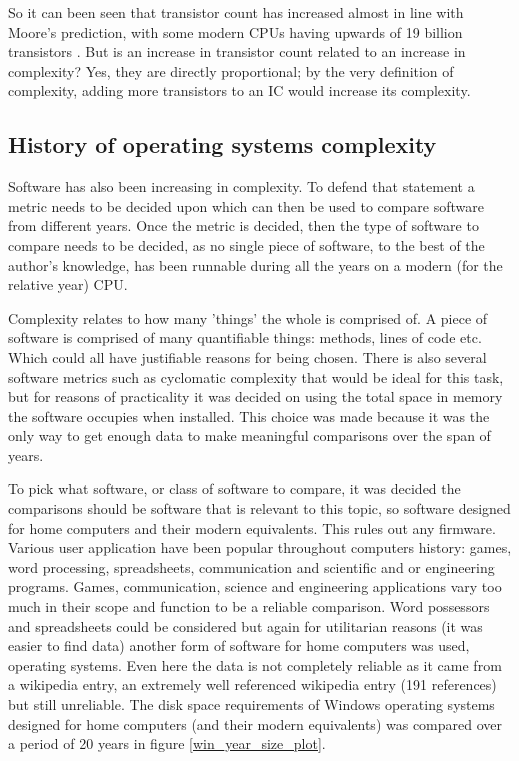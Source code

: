 So it can been seen that transistor count has increased almost in line with Moore's prediction, with some modern CPUs having upwards of 19 billion transistors 
\cite{RN80}. But is an increase in transistor count related to an increase in complexity? Yes, they are directly proportional; by the very definition of complexity, adding more transistors to an IC would increase its complexity.

\subsection{History of operating systems complexity}

Software has also been increasing in complexity. To defend that statement a metric needs to be decided upon which can then be used to compare software from different years. Once the metric is decided, then the type of software to compare needs to be decided, as no single piece of software, to the best of the author's knowledge, has been runnable during all the years on a modern (for the relative year) CPU.

Complexity relates to how many 'things' the whole is comprised of. A piece of software is comprised of many quantifiable things: methods, lines of code etc. Which could all have justifiable reasons for being chosen. There is also several software metrics such as cyclomatic complexity that would be ideal for this task, but for reasons of practicality it was decided on using the total space in memory the software occupies when installed. This choice was made because it was the only way to get enough data to make meaningful comparisons over the span of years.

To pick what software, or class of software to compare, it was decided the comparisons should be software that is relevant to this topic, so software designed for home computers and their modern equivalents. This rules out any firmware. Various user application have been popular throughout computers history: games, word processing, spreadsheets, communication and scientific and or engineering  programs. Games, communication, science and engineering applications vary too much in their scope and function to be a reliable comparison. Word possessors and spreadsheets could be considered but again for utilitarian reasons (it was easier to find data) another form of software for home computers was used, operating systems. Even here the data is not completely reliable as it came from a wikipedia entry, an extremely well referenced wikipedia entry (191 references) but still unreliable. The disk space requirements of Windows operating systems designed for home computers (and their modern equivalents) was compared over a period of 20 years in figure \ref{win_year_size_plot}\cite{comp_win}.

